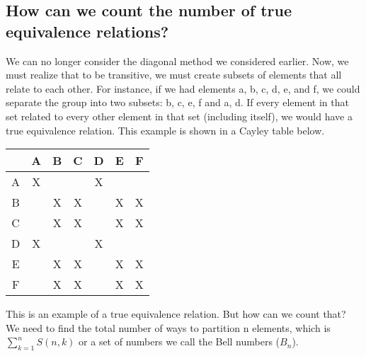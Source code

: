 \subsection{How can we count the number of true equivalence relations?}
We can no longer consider the diagonal method we considered earlier. Now, we must realize that to be transitive, we must create subsets of elements that all relate to each other. For instance, if we had elements a, b, c, d, e, and f, we could separate the group into two subsets: {b, c, e, f} and {a, d}. If every element in that set related to every other element in that set (including itself), we would have a true equivalence relation. This example is shown in a Cayley table below.
\begin{center}
\begin{tabular} {c|c c c c c c}
& A & B & C & D & E & F \\
\hline
A & X &  &  & X & & \\
B &  & X & X &  & X & X \\
C &  & X & X & & X & X \\
D & X &  &  & X & &\\
E &  & X & X &  & X & X\\
F &  & X & X &  & X & X\\
\end{tabular}
\end{center}
This is an example of a true equivalence relation. But how can we count that? We need to find the total number of ways to partition n elements, which is \(\sum^{n}_{k=1}S(n,k)\) or a set of numbers we call the Bell numbers (\(B_{n}\)).
% 

